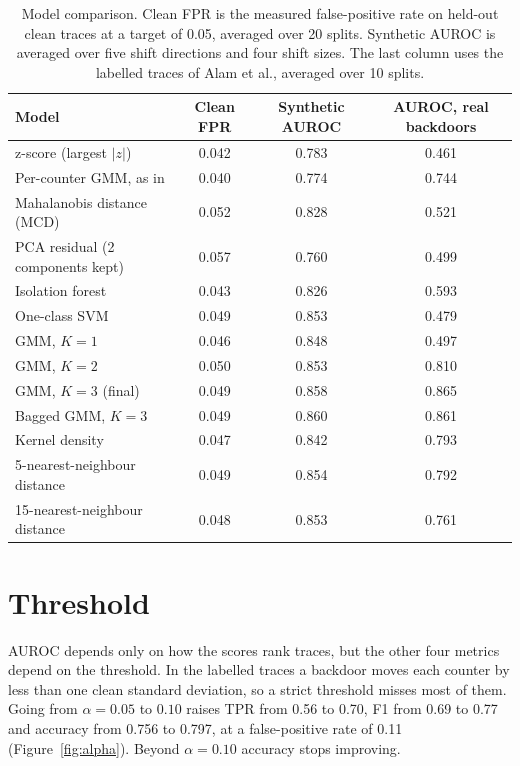 \documentclass[11pt,a4paper]{article}
\begin{document}
\begin{table}[t]
  \centering
  \small
  \begin{tabular}{lccc}
    \toprule
    Model & Clean FPR & Synthetic AUROC & AUROC, real backdoors \\
    \midrule
    z-score (largest $|z|$)              & 0.042 & 0.783 & 0.461 \\
    Per-counter GMM, as in \cite{alam2024} & 0.040 & 0.774 & 0.744 \\
    Mahalanobis distance (MCD)           & 0.052 & 0.828 & 0.521 \\
    PCA residual (2 components kept)     & 0.057 & 0.760 & 0.499 \\
    Isolation forest                     & 0.043 & 0.826 & 0.593 \\
    One-class SVM                        & 0.049 & 0.853 & 0.479 \\
    \midrule
    GMM, $K=1$                           & 0.046 & 0.848 & 0.497 \\
    GMM, $K=2$                           & 0.050 & 0.853 & 0.810 \\
    GMM, $K=3$ (final)                   & 0.049 & 0.858 & 0.865 \\
    \midrule
    Bagged GMM, $K=3$                    & 0.049 & 0.860 & 0.861 \\
    Kernel density                       & 0.047 & 0.842 & 0.793 \\
    5-nearest-neighbour distance         & 0.049 & 0.854 & 0.792 \\
    15-nearest-neighbour distance        & 0.048 & 0.853 & 0.761 \\
    \bottomrule
  \end{tabular}
  \caption{Model comparison. Clean FPR is the measured false-positive rate on held-out clean traces at a target
  of 0.05, averaged over 20 splits. Synthetic AUROC is averaged over five shift directions and four shift sizes.
  The last column uses the labelled traces of Alam et al., averaged over 10 splits.}
  \label{tab:models}
\end{table}

\section{Threshold}

AUROC depends only on how the scores rank traces, but the other four metrics depend on the threshold. In the
labelled traces a backdoor moves each counter by less than one clean standard deviation, so a strict threshold
misses most of them. Going from $\alpha = 0.05$ to $0.10$ raises TPR from 0.56 to 0.70, F1 from 0.69 to 0.77 and
accuracy from 0.756 to 0.797, at a false-positive rate of 0.11 (Figure~\ref{fig:alpha}). Beyond $\alpha = 0.10$
accuracy stops improving.
\end{document}
